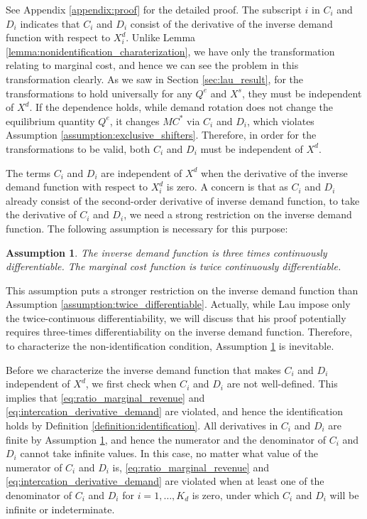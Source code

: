 \documentclass[11pt, a4paper]{article}
\newtheorem{assumption}{Assumption}
\theoremstyle{remark}
\begin{document}
See Appendix \ref{appendix:proof} for the detailed proof.
The subscript $i$ in $C_i$ and $D_i$ indicates that $C_i$ and $D_i$ consist of the derivative of the inverse demand function with respect to $X^{d}_i$.
Unlike Lemma \ref{lemma:nonidentification_charaterization}, we have only the transformation relating to marginal cost, and hence we can see the problem in this transformation clearly. 
As we saw in Section \ref{sec:lau_result}, for the transformations to hold universally for any $Q^e$ and $X^{s}$, they must be independent of $X^{d}$.
If the dependence holds, while demand rotation does not change the equilibrium quantity $Q^e$, it changes $MC^{*}$ via $C_i$ and $D_i$, which violates Assumption \ref{assumption:exclusive_shifters}. 
Therefore, in order for the transformations to be valid, both $C_i$ and $D_i$ must be independent of $X^{d}$.

The terms $C_i$ and $D_i$ are independent of $X^{d}$ when the derivative of the inverse demand function with respect to $X^{d}_i$ is zero.
A concern is that as $C_i$ and $D_i$ already consist of the second-order derivative of inverse demand function, to take the derivative of $C_i$ and $D_i$, we need a strong restriction on the inverse demand function.
The following assumption is necessary for this purpose:
\begin{assumption}\label{assumption:three_times_differentiable}
    The inverse demand function is three times continuously differentiable.
    The marginal cost function is twice continuously differentiable.
\end{assumption}
This assumption puts a stronger restriction on the inverse demand function than Assumption \ref{assumption:twice_differentiable}.
Actually, while Lau impose only the twice-continuous differentiability, we will discuss that his proof potentially requires three-times differentiability on the inverse demand function.
Therefore, to characterize the non-identification condition, Assumption \ref{assumption:three_times_differentiable} is inevitable.


Before we characterize the inverse demand function that makes $C_i$ and $D_i$ independent of $X^{d}$, we first check when $C_i$ and $D_i$ are not well-defined.
This implies that \eqref{eq:ratio_marginal_revenue} and \eqref{eq:intercation_derivative_demand} are violated, and hence the identification holds by Definition \ref{definition:identification}.
All derivatives in $C_i$ and $D_i$ are finite by Assumption \ref{assumption:three_times_differentiable}, and hence the numerator and the denominator of $C_i$ and $D_i$ cannot take infinite values.
In this case, no matter what value of the numerator of $C_i$ and $D_i$ is, \eqref{eq:ratio_marginal_revenue} and \eqref{eq:intercation_derivative_demand} are violated when at least one of the denominator of $C_i$ and $D_i$ for $i= 1, \ldots, K_d$ is zero, under which $C_i$ and $D_i$ will be infinite or indeterminate.
\end{document}
